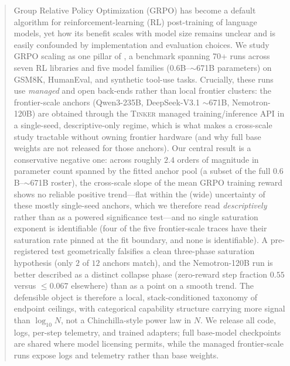 \begin{abstract}
Group Relative Policy Optimization (GRPO) has become a default algorithm for
reinforcement-learning (RL) post-training of language models, yet how its benefit
scales with model size remains unclear and is easily confounded by implementation
and evaluation choices. We study GRPO scaling as one pillar of \ours{}, a
benchmark spanning 70+ runs across seven RL libraries and five model families
($0.6$B--$\sim$671B parameters) on GSM8K, HumanEval, and synthetic tool-use tasks.
Crucially, these runs use \emph{managed} and open back-ends rather than local
frontier clusters: the frontier-scale anchors (Qwen3-235B, DeepSeek-V3.1
$\sim$671B, Nemotron-120B) are obtained through the \textsc{Tinker} managed
training/inference API in a single-seed, descriptive-only regime, which is what
makes a cross-scale study tractable without owning frontier hardware (and why full
base weights are not released for those anchors).
Our central result is a conservative negative one: across roughly $2.4$ orders of
magnitude in parameter count spanned by the fitted anchor pool (a subset of the
full $0.6$B--$\sim$671B roster), the cross-scale slope of the mean GRPO training
reward shows no reliable positive trend---flat within the (wide) uncertainty of
these mostly single-seed anchors, which we therefore read \emph{descriptively}
rather than as a powered significance test---and no single saturation exponent is identifiable
(four of the five frontier-scale traces have their saturation rate pinned at the
fit boundary, and none is identifiable). A pre-registered test geometrically falsifies a clean three-phase
saturation hypothesis (only $2$ of $12$ anchors match), and the Nemotron-120B run
is better described as a distinct collapse phase (zero-reward step fraction $0.55$
versus $\le 0.067$ elsewhere) than as a point on a smooth trend. The defensible
object is therefore a local, stack-conditioned taxonomy of endpoint ceilings,
with categorical capability structure carrying more signal than $\log_{10} N$,
not a Chinchilla-style power law in $N$. We
release all code, logs, per-step telemetry, and trained adapters; full base-model
checkpoints are shared where model licensing permits, while the managed
frontier-scale runs expose logs and telemetry rather than base weights.
\end{abstract}
